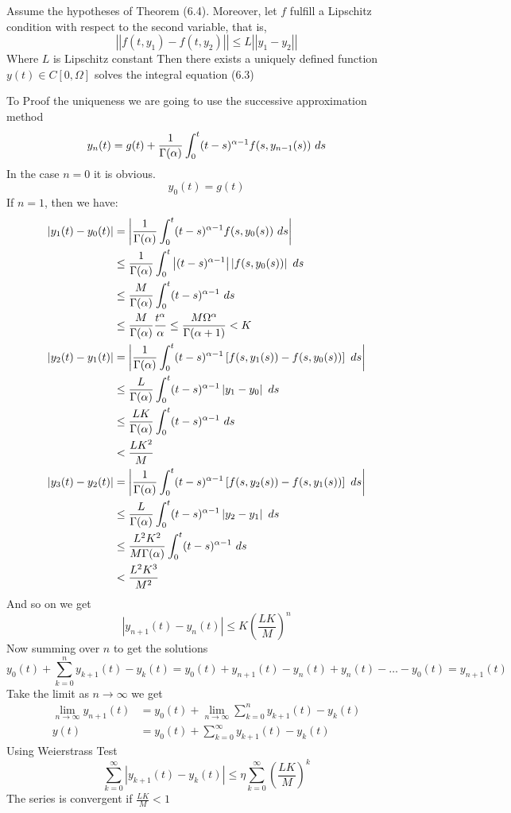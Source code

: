 \begin{theorem}
    Assume the hypotheses of Theorem (6.4). Moreover, let $f$ fulfill a Lipschitz condition with respect to the second variable,
    that is,
    \[
        \left|\left| f(t,y_1)-f(t,y_2) \right|\right| \leq L \left|\left| y_1-y_2 \right|\right|
    \]
    Where $L$ is Lipschitz constant Then there exists a uniquely defined function $y(t) \in C[0, \Omega]$ solves the integral equation (6.3)
\end{theorem}
To Proof the uniqueness we are going to use the successive approximation method
\[
        y_n(t) = g(t) + \frac{1}{\Gamma(\alpha)} \int_{0}^{t} (t-s)^{\alpha-1}f(s,y_{n-1}(s)) \,\, ds
\]
In the case $n = 0$ it is obvious.
\[
    y_0(t) = g(t)
\]
If $n = 1$, then we have:
\begin{align*}
    |y_1(t)-y_0(t)| &= \left| \frac{1}{\Gamma(\alpha)} \int_{0}^{t} (t-s)^{\alpha-1}f(s,y_{0}(s)) \,\, ds \right|
    \\
    &\leq \frac{1}{\Gamma(\alpha)} \int_{0}^{t} \left|(t-s)^{\alpha-1}\right|\left|f(s,y_{0}(s))\right| \,\, ds 
    \\
    &\leq \frac{M}{\Gamma(\alpha)} \int_{0}^{t} (t-s)^{\alpha-1} \,\, ds 
    \\
    &\leq \frac{M}{\Gamma(\alpha)}\frac{t^\alpha}{\alpha} \leq \frac{M\Omega^\alpha}{\Gamma(\alpha+1)} < K
    \\
    |y_2(t)-y_1(t)| &= \left| \frac{1}{\Gamma(\alpha)} \int_{0}^{t} (t-s)^{\alpha-1}\left[f(s,y_{1}(s))-f(s,y_{0}(s))\right] \,\, ds \right|
    \\
    &\leq \frac{L}{\Gamma(\alpha)} \int_{0}^{t} (t-s)^{\alpha-1} \left|y_1-y_0\right| \,\, ds 
    \\
    &\leq \frac{LK}{\Gamma(\alpha)} \int_{0}^{t} (t-s)^{\alpha-1} \,\, ds 
    \\
    &<  \frac{LK^2}{M}
    \\
    |y_3(t)-y_2(t)| &= \left| \frac{1}{\Gamma(\alpha)} \int_{0}^{t} (t-s)^{\alpha-1}\left[f(s,y_{2}(s))-f(s,y_{1}(s))\right] \,\, ds \right|
    \\
    &\leq \frac{L}{\Gamma(\alpha)} \int_{0}^{t} (t-s)^{\alpha-1} \left|y_2-y_1\right| \,\, ds 
    \\
    &\leq \frac{L^2K^2}{M\Gamma(\alpha)} \int_{0}^{t} (t-s)^{\alpha-1} \,\, ds 
    \\
    &< \frac{L^2K^3}{M^2}
\end{align*}
And so on we get 
\[
    |y_{n+1}(t)-y_{n}(t)| \leq K \left(\frac{LK}{M}\right)^{n}
\]
Now summing over $n$ to get the solutions
\[
    y_{0}(t) + \sum_{k=0}^{n} y_{k+1}(t)-y_{k}(t) = y_{0}(t) + y_{n+1}(t)-y_{n}(t)+y_{n}(t)-\dots-y_{0}(t) = y_{n+1}(t)
\]
Take the limit as $n \to \infty$ we get 
\begin{align*}
    \lim_{n \to \infty} y_{n+1}(t) &= y_{0}(t) + \lim_{n \to \infty} \sum_{k=0}^{n} y_{k+1}(t)-y_{k}(t)
    \\
    y(t) &= y_{0}(t) + \sum_{k=0}^{\infty} y_{k+1}(t)-y_{k}(t)
\end{align*}
Using Weierstrass Test 
\[
    \sum_{k=0}^{\infty} |y_{k+1}(t)-y_{k}(t)| \leq \eta \sum_{k=0}^{\infty} \left(\frac{LK}{M}\right)^{k}
\]
The series is convergent if $\displaystyle \frac{LK}{M} < 1$

